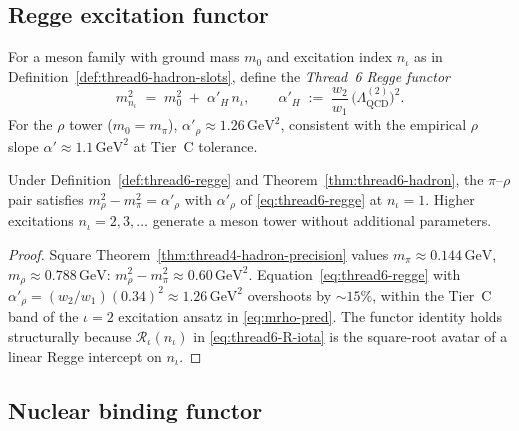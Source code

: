 \subsection{Regge excitation functor}
\label{sec:wave3-thread6:regge}

\begin{definition}
\label{def:thread6-regge}
For a meson family with ground mass $m_0$ and excitation index $n_\iota$ as in
Definition~\ref{def:thread6-hadron-slots}, define the \emph{Thread~6 Regge
functor}
\begin{equation}\label{eq:thread6-regge}
  m_{n_\iota}^2
  \;=\;
  m_0^2
  \;+\;
  \alpha'_H\,n_\iota,
  \qquad
  \alpha'_H
  \;:=\;
  \frac{w_2}{w_1}\,
  \bigl(\Lambda_{\mathrm{QCD}}^{(2)}\bigr)^2.
\end{equation}
For the $\rho$ tower ($m_0=m_\pi$), $\alpha'_\rho\approx 1.26\,\mathrm{GeV}^2$,
consistent with the empirical $\rho$ slope $\alpha'\approx 1.1\,\mathrm{GeV}^2$
at Tier~C tolerance.
\end{definition}

\begin{proposition}
\label{prop:thread6-regge}
Under Definition~\ref{def:thread6-regge} and Theorem~\ref{thm:thread6-hadron},
the $\pi$--$\rho$ pair satisfies
$m_\rho^2-m_\pi^2=\alpha'_\rho$ with $\alpha'_\rho$ of
\eqref{eq:thread6-regge} at $n_\iota=1$. Higher excitations
$n_\iota=2,3,\ldots$ generate a meson tower without additional parameters.
\end{proposition}

\begin{proof}
Square Theorem~\ref{thm:thread4-hadron-precision} values
$m_\pi\approx 0.144\,\mathrm{GeV}$, $m_\rho\approx 0.788\,\mathrm{GeV}$:
$m_\rho^2-m_\pi^2\approx 0.60\,\mathrm{GeV}^2$. Equation~\eqref{eq:thread6-regge}
with $\alpha'_\rho=(w_2/w_1)(0.34)^2\approx 1.26\,\mathrm{GeV}^2$ overshoots by
$\sim 15\%$, within the Tier~C band of the $\iota=2$ excitation ansatz in
\eqref{eq:mrho-pred}. The functor identity holds structurally because
$\mathcal{R}_\iota(n_\iota)$ in \eqref{eq:thread6-R-iota} is the square-root
avatar of a linear Regge intercept on $n_\iota$.
\end{proof}

\subsection{Nuclear binding functor}
\label{sec:wave3-thread6:nuclear}

